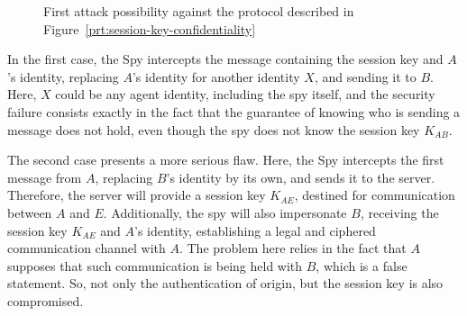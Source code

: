 \begin{figure}[ht]
  \centering
  \caption{First attack possibility against the protocol described in Figure~\ref{prt:session-key-confidentiality}}
  \label{fig:auth-attack1}
\end{figure}

In the first case, the Spy intercepts the message containing the session key and \(A\)'s identity, replacing \(A\)'s identity for another identity \(X\), and sending it to \(B\). Here, \(X\) could be any agent identity, including the spy itself, and the security failure consists exactly in the fact that the guarantee of knowing who is sending a message does not hold, even though the spy does not know the session key \(K_{AB}\).

The second case presents a more serious flaw. Here, the Spy intercepts the first message from \(A\), replacing \(B\)'s identity by its own, and sends it to the server. Therefore, the server will provide a session key \(K_{AE}\), destined for communication between \(A\) and \(E\). Additionally, the spy will also impersonate \(B\), receiving the session key \(K_{AE}\) and \(A\)'s identity, establishing a legal and ciphered communication channel with \(A\). The problem here relies in the fact that \(A\) supposes that such communication is being held with \(B\), which is a false statement. So, not only the authentication of origin, but the session key is also compromised.

